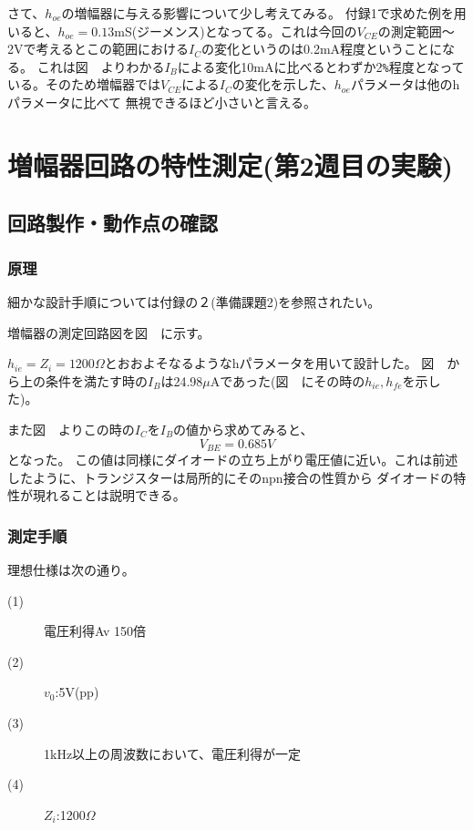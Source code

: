 \documentclass[11pt,a4j,titlepage]{jsarticle}
\begin{document}
  
  
  さて、$h_{oe}$の増幅器に与える影響について少し考えてみる。
  付録1で求めた例を用いると、$h_{oe}=0.13$mS(ジーメンス)となってる。これは今回の$V_{CE}$の測定範囲～2Vで考えるとこの範囲における$I_C$の変化というのは0.2mA程度ということになる。
  これは図\ \ よりわかる$I_B$による変化10mAに比べるとわずか2\verb|%|程度となっている。そのため増幅器では$V_{CE}$による$I_C$の変化を示した、$h_{oe}$パラメータは他のhパラメータに比べて
  無視できるほど小さいと言える。
  
  
 
 
   
   \clearpage
  
  
  
  
  
  
 \section{増幅器回路の特性測定(第2週目の実験)}
  
  \subsection{回路製作・動作点の確認}
 
   \subsubsection{原理}
   
   細かな設計手順については付録の２(準備課題2)を参照されたい。
   
   増幅器の測定回路図を図\ \ に示す。
   
   $h_{ie}=Z_i=1200\Omega$とおおよそなるようなhパラメータを用いて設計した。
   図\ \ から上の条件を満たす時の$I_B$は24.98$\mu$Aであった(図\ \ にその時の$h_{ie},h_{fe}$を示した)。
   
   また図\ \ よりこの時の$I_C$を$I_B$の値から求めてみると、
   \begin{equation}
    V_{BE} = 0.685 V
   \end{equation}
   となった。
   この値は同様にダイオードの立ち上がり電圧値に近い。これは前述したように、トランジスターは局所的にそのnpn接合の性質から
   ダイオードの特性が現れることは説明できる。

  
  
  \newpage
  
   \subsubsection{測定手順}
  理想仕様は次の通り。
  \begin{description}
   \item[(1)] 電圧利得Av 150倍
   \item[(2)] $v_0$:5V(pp)
   \item[(3)] 1kHz以上の周波数において、電圧利得が一定
   \item[(4)] $Z_i$:1200$\Omega$
  \end{description}
  
\end{document}
